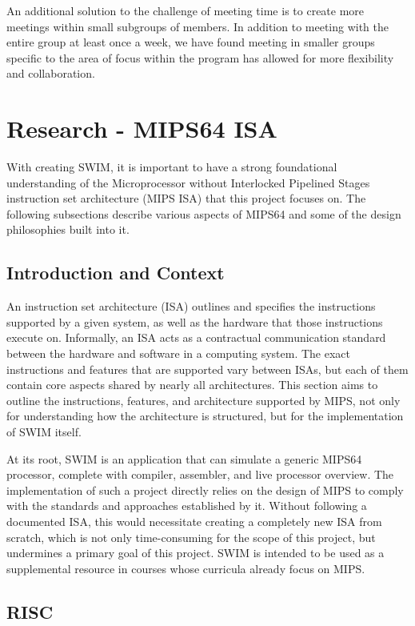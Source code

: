 \documentclass[
    paper=letter,
    parskip=half,
    fontsize=12pt,
    titlepage=firstiscover,
    toc=bibliography,
    numbers=endperiod
]{scrartcl}
\let\oldsection\section
\renewcommand{\section}{\newpage\oldsection}
\begin{document}
An additional solution to the challenge of meeting time is to create
more meetings within small subgroups of members. In addition to meeting
with the entire group at least once a week, we have found meeting in
smaller groups specific to the area of focus within the program has
allowed for more flexibility and collaboration.

\section{Research - MIPS64 ISA}

With creating SWIM, it is important to have a strong foundational
understanding of the Microprocessor without Interlocked Pipelined Stages
instruction set architecture (MIPS ISA) that this project focuses on.
The following subsections describe various aspects of MIPS64 and some of
the design philosophies built into it.

\subsection{Introduction and Context}

An instruction set architecture (ISA) outlines and specifies the
instructions supported by a given system, as well as the hardware that
those instructions execute on. Informally, an ISA acts as a contractual
communication standard between the hardware and software in a computing
system. The exact instructions and features that are supported vary
between ISAs, but each of them contain core aspects shared by nearly all
architectures. This section aims to outline the instructions, features,
and architecture supported by MIPS, not only for understanding how the
architecture is structured, but for the implementation of SWIM itself.

At its root, SWIM is an application that can simulate a generic MIPS64
processor, complete with compiler, assembler, and live processor
overview. The implementation of such a project directly relies on the
design of MIPS to comply with the standards and approaches established
by it. Without following a documented ISA, this would necessitate
creating a completely new ISA from scratch, which is not only
time-consuming for the scope of this project, but undermines a primary
goal of this project. SWIM is intended to be used as a supplemental
resource in courses whose curricula already focus on MIPS.

\subsection{RISC}
\end{document}
